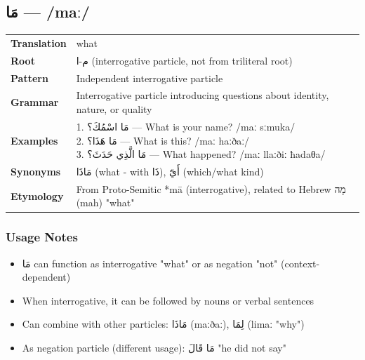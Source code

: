 \documentclass[letterpaper,12pt]{article}
\begin{document}
\subsection{\textarabic{مَا} — /maː/}
\begin{tabular}{p{3cm}p{10cm}}
\toprule
\textbf{Translation} & what \\
\textbf{Root} & \textarabic{م-ا} (interrogative particle, not from triliteral root) \\
\textbf{Pattern} & Independent interrogative particle \\
\textbf{Grammar} & Interrogative particle introducing questions about identity, nature, or quality \\
\midrule
\textbf{Examples} & \makecell[l]{\parbox{9.5cm}{
1. \textarabic{مَا اسْمُكَ؟} — What is your name? /maː sːmuka/\\
2. \textarabic{مَا هَذَا؟} — What is this? /maː haːðaː/\\
3. \textarabic{مَا الَّذِي حَدَثَ؟} — What happened? /maː llaːðiː ħadaθa/
}} \\
\midrule
\textbf{Synonyms} & \textarabic{مَاذَا} (what - with \textarabic{ذَا}), \textarabic{أَيّ} (which/what kind) \\
\textbf{Etymology} & From Proto-Semitic *mā (interrogative), related to Hebrew \texthebrew{מָה} (mah) "what" \\
\bottomrule
\end{tabular}

\subsubsection*{Usage Notes}
\begin{itemize}
  \item \textarabic{مَا} can function as interrogative "what" or as negation "not" (context-dependent)
  \item When interrogative, it can be followed by nouns or verbal sentences
  \item Can combine with other particles: \textarabic{مَاذَا} (maːðaː), \textarabic{لِمَا} (limaː "why")
  \item As negation particle (different usage): \textarabic{مَا قَالَ} "he did not say"
\end{itemize}
\end{document}
